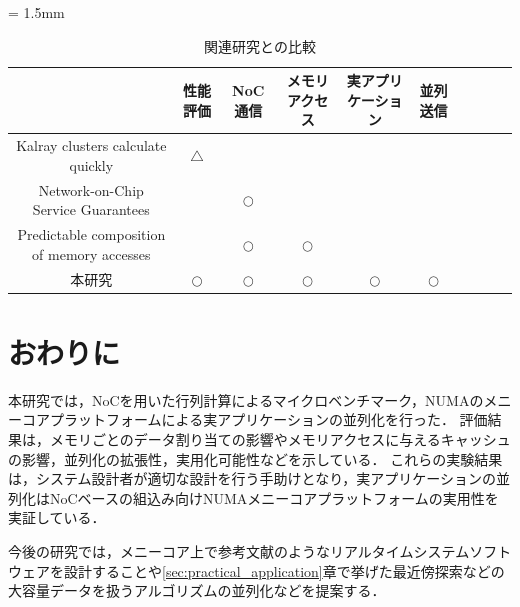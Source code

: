 \documentclass[submit,techrep]{ipsj_v2/UTF8/ipsj}
\begin{document}
\begin{table}[t]
  \caption{\label{tb:comparison_relatedwork}
    関連研究との比較}
  \centering
  \scriptsize	                    %
  \tabcolsep = 1.5mm              %
  \begin{tabular}{c|ccccccccc}
    \hline
    & 性能評価 & NoC通信 & メモリアクセス & 実アプリケーション & 並列送信 & \\
    \hline
    \hline
    Kalray clusters calculate quickly \cite{kanter2015kalray} & \(\triangle\) &  &  &  &  & \\
    Network-on-Chip Service Guarantees \cite{denet2017work} &  & \(\bigcirc\) &  &  &  & \\
    Predictable composition of memory accesses \cite{perret2016predictable} &  & \(\bigcirc\) & \(\bigcirc\) &  &  & \\
    本研究 & \(\bigcirc\) & \(\bigcirc\) & \(\bigcirc\) & \(\bigcirc\) & \(\bigcirc\) & \\
    \hline
  \end{tabular}
\end{table}

\section{おわりに}
\label{sec:conclusion}
本研究では，NoCを用いた行列計算によるマイクロベンチマーク，NUMAのメニーコアプラットフォームによる実アプリケーションの並列化を行った．
評価結果は，メモリごとのデータ割り当ての影響やメモリアクセスに与えるキャッシュの影響，並列化の拡張性，実用化可能性などを示している．
これらの実験結果は，システム設計者が適切な設計を行う手助けとなり，実アプリケーションの並列化はNoCベースの組込み向けNUMAメニーコアプラットフォームの実用性を実証している．

今後の研究では，メニーコア上で参考文献\cite{maruyama2016ros2}のようなリアルタイムシステムソフトウェアを設計することや\ref{sec:practical_application}章で挙げた最近傍探索などの大容量データを扱うアルゴリズムの並列化などを提案する．



\end{document}
